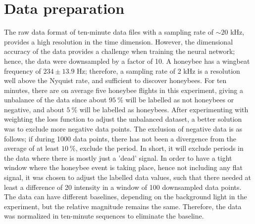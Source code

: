 \section{Data preparation}

The raw data format of ten-minute data files with a sampling rate of $\sim 20$ kHz, provides a high resolution in the time dimension. However, the dimensional accuracy of the data provides a challenge when training the neural network; hence, the data were downsampled by a factor of 10. A honeybee has a wingbeat frequency of $234 \pm 13.9$ Hz\cite{10.1242/jeb.154609}; therefore, a sampling rate of 2 kHz is a resolution well above the Nyquist rate, and sufficient to discover honeybees. 
For ten minutes, there are on average five honeybee flights in this experiment, giving a unbalance of the data since about $95 \:  \%$ will be labelled as not honeybees or negative, and about $5 \:  \%$ will be labelled as honeybees. After experimenting with weighting the loss function to adjust the unbalanced dataset, a better solution was to exclude more negative data points. The exclusion of negative data is as follows; if during 1000 data points, there has not been a divergence from the average of at least $10 \: \%$, exclude the period. In short, it will exclude periods in the data where there is mostly just a 'dead' signal. In order to have a tight window where the honeybee event is taking place, hence not including any flat signal, it was chosen to adjust the labelled data values, such that there needed at least a difference of 20 intensity in a window of 100 downsampled data points. 
The data can have different baselines, depending on the background light in the experiment, but the relative magnitude remains the same. Therefore, the data was normalized in ten-minute sequences to eliminate the baseline. 

